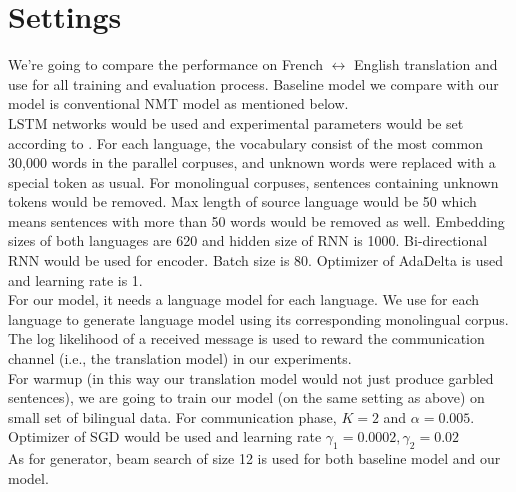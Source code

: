 \documentclass[11pt]{article}
\begin{document}
{\part{Settings}
We're going to compare the performance on French $\leftrightarrow$ English translation and use \href{https://github.com/OpenNMT/OpenNMT-py}{\color{blue}{OpenNMT in PyTorch }} for all training and evaluation process. Baseline model we compare with our model is conventional NMT model as mentioned below.
\\
\newline
\indent LSTM networks would be used and experimental parameters would be set according to \cite{bahdanau2014neural}. For each language, the vocabulary consist of the most common 30,000 words in the parallel corpuses, and unknown words were replaced with a special token as usual. For monolingual corpuses, sentences containing unknown tokens would be removed. Max length of source language would be 50 which means sentences with more than 50 words would be removed as well. Embedding sizes of both languages are 620 and hidden size of RNN is 1000. Bi-directional RNN would be used for encoder. Batch size is 80. Optimizer of AdaDelta is used and learning rate is 1.
\\
\newline
\indent For our model, it needs a language model for each language. We use \href{https://github.com/mspandit/rnnlm}{\color{blue}{RNNLM Toolkit}}\cite{mikolov2010recurrent} for each language to generate language model using its corresponding monolingual corpus. The log likelihood of a received message is used to reward the communication channel (i.e., the translation model) in our experiments.
\\
\newline
\indent For warmup (in this way our translation model would not just produce garbled sentences), we are going to train our model (on the same setting as above) on small set of bilingual data. For communication phase, $K=2$ and $\alpha = 0.005$. Optimizer of SGD would be used and learning rate $\gamma_1 = 0.0002, \gamma_2=0.02$
\\
\newline
\indent As for generator, beam search of size 12 is used for both baseline model and our model.
}
\end{document}
